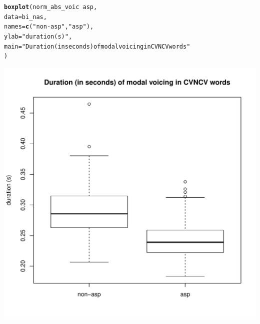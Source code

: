 \documentclass[a4paper,11pt]{article}\usepackage[]{graphicx}\usepackage[]{color}
\makeatletter
\def\maxwidth{ %
  \ifdim\Gin@nat@width>\linewidth
    \linewidth
  \else
    \Gin@nat@width
  \fi
}
\newcommand{\hlstr}[1]{\textcolor[rgb]{0.192,0.494,0.8}{#1}}%
\newcommand{\hlopt}[1]{\textcolor[rgb]{0,0,0}{#1}}%
\newcommand{\hlstd}[1]{\textcolor[rgb]{0.345,0.345,0.345}{#1}}%
\newcommand{\hlkwc}[1]{\textcolor[rgb]{0.333,0.667,0.333}{#1}}%
\newcommand{\hlkwd}[1]{\textcolor[rgb]{0.737,0.353,0.396}{\textbf{#1}}}%
\newenvironment{kframe}{%
 \def\at@end@of@kframe{}%
 \ifinner\ifhmode%
  \def\at@end@of@kframe{\end{minipage}}%
  \begin{minipage}{\columnwidth}%
 \fi\fi%
 \def\FrameCommand##1{\hskip\@totalleftmargin \hskip-\fboxsep
 \colorbox{shadecolor}{##1}\hskip-\fboxsep
     \hskip-\linewidth \hskip-\@totalleftmargin \hskip\columnwidth}%
 \MakeFramed {\advance\hsize-\width
   \@totalleftmargin\z@ \linewidth\hsize
   \@setminipage}}%
 {\par\unskip\endMakeFramed%
 \at@end@of@kframe}
\newenvironment{knitrout}{}{} %
\makeatother
\begin{document}
\begin{knitrout}
\end{knitrout}

\begin{knitrout}
\color{fgcolor}\begin{kframe}
\begin{alltt}
\hlkwd{boxplot}\hlstd{(norm_abs_voic} \hlopt{~} \hlstd{asp,}
        \hlkwc{data} \hlstd{= bi_nas,}
        \hlkwc{names} \hlstd{=} \hlkwd{c}\hlstd{(}\hlstr{"non-asp"}\hlstd{,} \hlstr{"asp"}\hlstd{),}
        \hlkwc{ylab} \hlstd{=} \hlstr{"duration (s)"}\hlstd{,}
        \hlkwc{main} \hlstd{=} \hlstr{"Duration (in seconds) of modal voicing in CVNCV words"}
        \hlstd{)}
\end{alltt}
\end{kframe}
\includegraphics[width=\maxwidth]{img/bi-nas-box-1} 

\end{knitrout}
\end{document}
